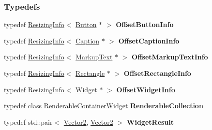 \subsubsection*{Typedefs}
\begin{DoxyCompactItemize}
\item 
\hypertarget{namespaceMezzanine_1_1UI_a3208d7ba1e2f5f32090be1fa559d3705}{
typedef \hyperlink{structMezzanine_1_1UI_1_1ResizingInfo}{ResizingInfo}$<$ \hyperlink{classMezzanine_1_1UI_1_1Button}{Button} $\ast$ $>$ {\bfseries OffsetButtonInfo}}
\label{namespaceMezzanine_1_1UI_a3208d7ba1e2f5f32090be1fa559d3705}

\item 
\hypertarget{namespaceMezzanine_1_1UI_a7c8324fa3d58ac346c6292a6076be255}{
typedef \hyperlink{structMezzanine_1_1UI_1_1ResizingInfo}{ResizingInfo}$<$ \hyperlink{classMezzanine_1_1UI_1_1Caption}{Caption} $\ast$ $>$ {\bfseries OffsetCaptionInfo}}
\label{namespaceMezzanine_1_1UI_a7c8324fa3d58ac346c6292a6076be255}

\item 
\hypertarget{namespaceMezzanine_1_1UI_aa0fd731e940a00cf9a7e0ee3bfc46677}{
typedef \hyperlink{structMezzanine_1_1UI_1_1ResizingInfo}{ResizingInfo}$<$ \hyperlink{classMezzanine_1_1UI_1_1MarkupText}{MarkupText} $\ast$ $>$ {\bfseries OffsetMarkupTextInfo}}
\label{namespaceMezzanine_1_1UI_aa0fd731e940a00cf9a7e0ee3bfc46677}

\item 
\hypertarget{namespaceMezzanine_1_1UI_a368ee856aca4d2f5c8e8ecd9048b212f}{
typedef \hyperlink{structMezzanine_1_1UI_1_1ResizingInfo}{ResizingInfo}$<$ \hyperlink{classMezzanine_1_1UI_1_1Rectangle}{Rectangle} $\ast$ $>$ {\bfseries OffsetRectangleInfo}}
\label{namespaceMezzanine_1_1UI_a368ee856aca4d2f5c8e8ecd9048b212f}

\item 
\hypertarget{namespaceMezzanine_1_1UI_a3d1a1ba48d981bd46e6db8a4eec8df60}{
typedef \hyperlink{structMezzanine_1_1UI_1_1ResizingInfo}{ResizingInfo}$<$ \hyperlink{classMezzanine_1_1UI_1_1Widget}{Widget} $\ast$ $>$ {\bfseries OffsetWidgetInfo}}
\label{namespaceMezzanine_1_1UI_a3d1a1ba48d981bd46e6db8a4eec8df60}

\item 
\hypertarget{namespaceMezzanine_1_1UI_a19f7113d40cb6939bf19a00168f66146}{
typedef class \hyperlink{classMezzanine_1_1UI_1_1RenderableContainerWidget}{RenderableContainerWidget} {\bfseries RenderableCollection}}
\label{namespaceMezzanine_1_1UI_a19f7113d40cb6939bf19a00168f66146}

\item 
\hypertarget{namespaceMezzanine_1_1UI_a925e555c4438533f9381862e8b71fe9c}{
typedef std::pair$<$ \hyperlink{classMezzanine_1_1Vector2}{Vector2}, \hyperlink{classMezzanine_1_1Vector2}{Vector2} $>$ {\bfseries WidgetResult}}
\label{namespaceMezzanine_1_1UI_a925e555c4438533f9381862e8b71fe9c}

\end{DoxyCompactItemize}
